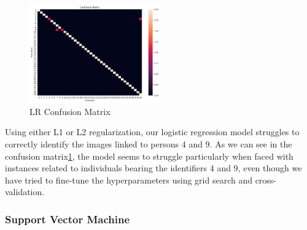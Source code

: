 \documentclass[12pt,a4paper,twocolumn]{article}
\begin{document}
\begin{figure}[ht!]
\centering
\includegraphics[width=0.5\textwidth]{images2/cmL2.png}

\caption{\label{fig:CML2} LR Confusion Matrix}
\end{figure}

Using either L1 or L2 regularization, our logistic regression model struggles to correctly identify the images linked to persons 4 and 9. As we can see in the confusion matrix\ref{fig:CML2}, the model seems to struggle particularly when faced with instances related to individuals bearing the identifiers 4 and 9, even though we have tried to fine-tune the hyperparameters using grid search and cross-validation.

\subsubsection{Support Vector Machine}
\end{document}
